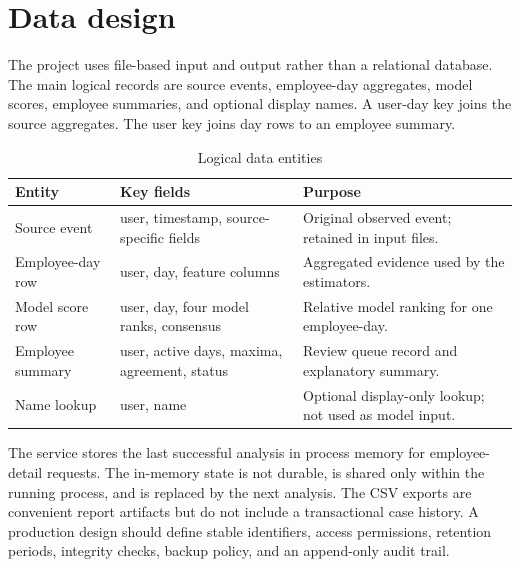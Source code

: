 \documentclass[12pt,a4paper,oneside]{report}
\newcommand{\tablefont}{\small}
\begin{document}
\section{Data design}
The project uses file-based input and output rather than a relational
database. The main logical records are source events, employee-day
aggregates, model scores, employee summaries, and optional display
names. A user-day key joins the source aggregates. The user key joins
day rows to an employee summary.

\begin{table}[H]
\centering
\tablefont
\caption{Logical data entities}
\label{tab:entities}
\begin{tabularx}{\textwidth}{|p{}|p{}|Y|}
\hline
\textbf{Entity} & \textbf{Key fields} & \textbf{Purpose}\\\hline
Source event & user, timestamp, source-specific fields & Original observed event; retained in input files.\\\hline
Employee-day row & user, day, feature columns & Aggregated evidence used by the estimators.\\\hline
Model score row & user, day, four model ranks, consensus & Relative model ranking for one employee-day.\\\hline
Employee summary & user, active days, maxima, agreement, status & Review queue record and explanatory summary.\\\hline
Name lookup & user, name & Optional display-only lookup; not used as model input.\\\hline
\end{tabularx}
\end{table}

The service stores the last successful analysis in process memory for
employee-detail requests. The in-memory state is not durable, is
shared only within the running process, and is replaced by the next
analysis. The CSV exports are convenient report artifacts but do not
include a transactional case history. A production design should
define stable identifiers, access permissions, retention periods,
integrity checks, backup policy, and an append-only audit trail.
\end{document}
